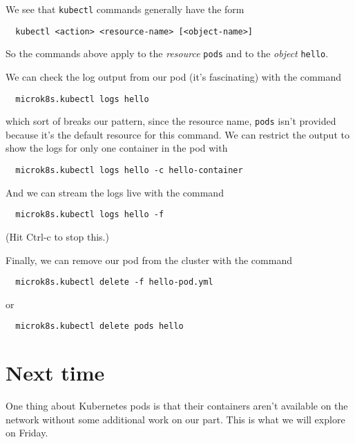 \documentclass{article}
\begin{document}
We see that \texttt{kubectl} commands generally have the form

\begin{verbatim}
  kubectl <action> <resource-name> [<object-name>]
\end{verbatim}

So the commands above apply to the \emph{resource} \texttt{pods} and to the \emph{object} \texttt{hello}.

We can check the log output from our pod (it's fascinating) with the command

\begin{verbatim}
  microk8s.kubectl logs hello
\end{verbatim} 

which sort of breaks our pattern, since the resource name, \texttt{pods} isn't provided because it's the default resource for this command. We can restrict the output to show the logs for only one container in the pod with 

\begin{verbatim}
  microk8s.kubectl logs hello -c hello-container
\end{verbatim} 
    
And we can stream the logs live with the command 

\begin{verbatim}
  microk8s.kubectl logs hello -f
\end{verbatim} 

(Hit Ctrl-c to stop this.)

Finally, we can remove our pod from the cluster with the command

\begin{verbatim}
  microk8s.kubectl delete -f hello-pod.yml
\end{verbatim} 

or

\begin{verbatim}
  microk8s.kubectl delete pods hello
\end{verbatim} 

\section{Next time}
One thing about Kubernetes pods is that their containers aren't available on the network without some additional work on our part. This is what we will explore on Friday.
\end{document}
